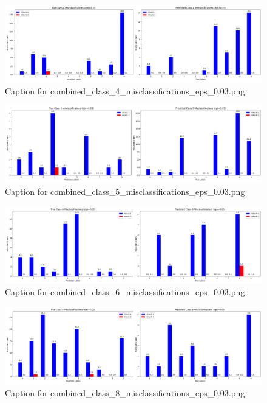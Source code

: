 \documentclass[11pt,onside]{article}
\begin{document}
\begin{figure}[ht]
\centering
\includegraphics[width=1\textwidth]{combined_class_boundary_pgd/combined_class_4_misclassifications_eps_0.03.png}
\caption{Caption for combined_class_4_misclassifications_eps_0.03.png}
\label{fig:combined_class_4_misclassifications_eps_0.03.png}
\end{figure}

\begin{figure}[ht]
\centering
\includegraphics[width=1\textwidth]{combined_class_boundary_pgd/combined_class_5_misclassifications_eps_0.03.png}
\caption{Caption for combined_class_5_misclassifications_eps_0.03.png}
\label{fig:combined_class_5_misclassifications_eps_0.03.png}
\end{figure}

\begin{figure}[ht]
\centering
\includegraphics[width=1\textwidth]{combined_class_boundary_pgd/combined_class_6_misclassifications_eps_0.03.png}
\caption{Caption for combined_class_6_misclassifications_eps_0.03.png}
\label{fig:combined_class_6_misclassifications_eps_0.03.png}
\end{figure}

\begin{figure}[ht]
\centering
\includegraphics[width=1\textwidth]{combined_class_boundary_pgd/combined_class_8_misclassifications_eps_0.03.png}
\caption{Caption for combined_class_8_misclassifications_eps_0.03.png}
\label{fig:combined_class_8_misclassifications_eps_0.03.png}
\end{figure}
\end{document}
